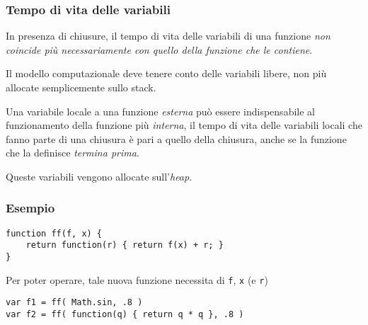 \subsubsection{Tempo di vita delle variabili}
In presenza di chiusure, il tempo di vita delle variabili di una funzione \textit{non coincide più necessariamente con quello della funzione che le contiene}.

Il modello computazionale deve tenere conto delle variabili libere, non più allocate semplicemente sullo stack.

Una variabile locale a una funzione \textit{esterna} può essere indispensabile al funzionamento della funzione più \textit{interna}, il tempo di vita delle variabili locali che fanno parte di una chiusura è pari a quello della chiusura, anche se la funzione che la definisce \textit{termina prima}.

Queste variabili vengono allocate sull'\textit{heap}.

\subsubsection{Esempio}
\begin{verbatim}
function ff(f, x) {
    return function(r) { return f(x) + r; }
}
\end{verbatim}

Per poter operare, tale nuova funzione necessita di \texttt{f}, \texttt{x} (e \texttt{r})
\begin{verbatim}
var f1 = ff( Math.sin, .8 )
var f2 = ff( function(q) { return q * q }, .8 )
\end{verbatim}

